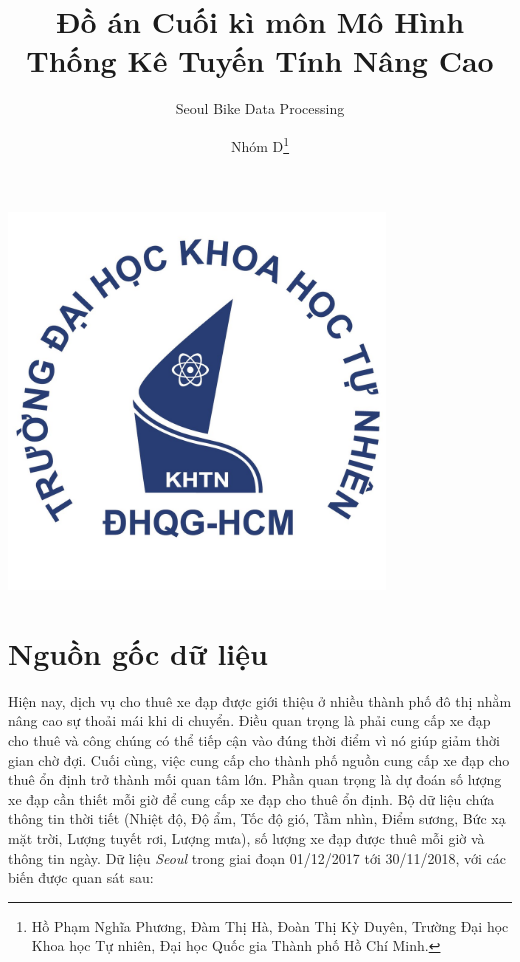 \documentclass[
  11pt,
  letterpaper,
]{article}
\title{Đồ án Cuối kì môn Mô Hình Thống Kê Tuyến Tính Nâng Cao}
\subtitle{Seoul Bike Data Processing}
\author{Nhóm D\footnote{Hồ Phạm Nghĩa Phương, Đàm Thị Hà, Đoàn Thị Kỳ Duyên, Trường Đại học Khoa học Tự nhiên, Đại học Quốc gia Thành phố Hồ Chí Minh.}}
\date{}
\begin{document}
\maketitle

\centering

\includegraphics[width=10cm]{logo.jpg}

\raggedright
\clearpage
\tableofcontents

\clearpage

\section{Nguồn gốc dữ liệu}

Hiện nay, dịch vụ cho thuê xe đạp được giới thiệu ở nhiều thành phố đô thị nhằm nâng cao sự thoải mái khi di chuyển. Điều quan trọng là phải cung cấp xe đạp cho thuê và công chúng có thể tiếp cận vào đúng thời điểm vì nó giúp giảm thời gian chờ đợi. Cuối cùng, việc cung cấp cho thành phố nguồn cung cấp xe đạp cho thuê ổn định trở thành mối quan tâm lớn. Phần quan trọng là dự đoán số lượng xe đạp cần thiết mỗi giờ để cung cấp xe đạp cho thuê ổn định. Bộ dữ liệu chứa thông tin thời tiết (Nhiệt độ, Độ ẩm, Tốc độ gió, Tầm nhìn, Điểm sương, Bức xạ mặt trời, Lượng tuyết rơi, Lượng mưa), số lượng xe đạp được thuê mỗi giờ và thông tin ngày. Dữ liệu \emph{Seoul} trong giai đoạn 01/12/2017 tới 30/11/2018, với các biến được quan sát sau:
\end{document}
